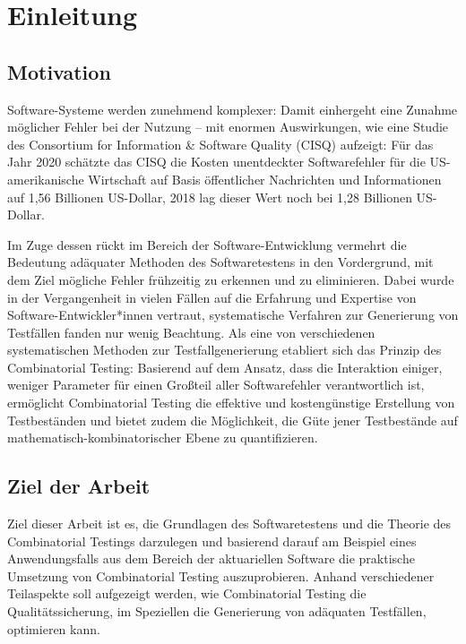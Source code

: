 \chapter{Einleitung}\label{chap:einleitung}

\section{Motivation}\label{sec:motivation}

Software-Systeme werden zunehmend komplexer: Damit einhergeht eine Zunahme möglicher Fehler bei der Nutzung -- mit enormen Auswirkungen, wie eine Studie des Consortium for Information \& Software Quality (CISQ) \cite{krasner2021cost} aufzeigt: Für das Jahr 2020 schätzte das CISQ die Kosten unentdeckter Softwarefehler für die US-amerikanische Wirtschaft auf Basis öffentlicher Nachrichten und Informationen auf 1,56 Billionen US-Dollar, 2018 lag dieser Wert noch bei 1,28 Billionen US-Dollar.

Im Zuge dessen rückt im Bereich der Software-Entwicklung vermehrt die Bedeutung adäquater Methoden des Softwaretestens in den Vordergrund, mit dem Ziel mögliche Fehler frühzeitig zu erkennen und zu eliminieren. Dabei wurde in der Vergangenheit in vielen Fällen auf die Erfahrung und Expertise von Software-Entwickler*innen vertraut, systematische Verfahren zur Generierung von Testfällen fanden nur wenig Beachtung. Als eine von verschiedenen systematischen Methoden zur Testfallgenerierung etabliert sich das Prinzip des Combinatorial Testing: Basierend auf dem Ansatz, dass die Interaktion einiger, weniger Parameter für einen Großteil aller Softwarefehler verantwortlich ist, ermöglicht Combinatorial Testing die effektive und kostengünstige Erstellung von Testbeständen und bietet zudem die Möglichkeit, die Güte jener Testbestände auf mathematisch-kombinatorischer Ebene zu quantifizieren.

\section{Ziel der Arbeit}\label{sec:zielderArbeit}

Ziel dieser Arbeit ist es, die Grundlagen des Softwaretestens und die Theorie des Combinatorial Testings darzulegen und basierend darauf am Beispiel eines Anwendungsfalls aus dem Bereich der aktuariellen Software die praktische Umsetzung von Combinatorial Testing auszuprobieren. Anhand verschiedener Teilaspekte soll aufgezeigt werden, wie Combinatorial Testing die Qualitätssicherung, im Speziellen die Generierung von adäquaten Testfällen, optimieren kann.

